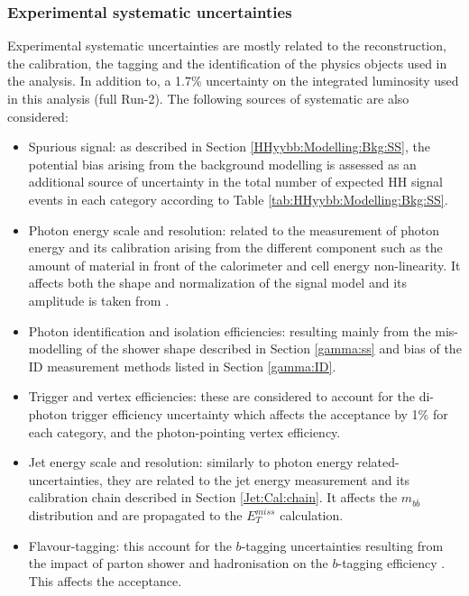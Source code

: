 \subsubsection{Experimental systematic uncertainties}
\label{HHyybb:Syst:Exp}
Experimental systematic uncertainties are mostly related to the reconstruction, the calibration, the tagging and the identification of the physics objects used in the analysis. In addition to, a 1.7\% uncertainty on the integrated luminosity used in this analysis (full Run-2). The following sources of systematic are also considered: 
\begin{itemize}
    \item Spurious signal: as described in Section \ref{HHyybb:Modelling:Bkg:SS}, the potential bias arising from the background modelling is assessed as an additional source of uncertainty in the total number of expected HH signal events in each category according to Table \ref{tab:HHyybb:Modelling:Bkg:SS}.
    \item Photon energy scale and resolution: related to the measurement of photon energy and its calibration arising from the different component such as the amount of material in front of the calorimeter and cell energy non-linearity. It affects both the shape and normalization of the signal model and its amplitude is taken from \cite{PES}.
    \item Photon identification and isolation efficiencies: resulting mainly from the mis-modelling of the shower shape described in Section \ref{gamma:ss} and bias of the ID measurement methods listed in Section \ref{gamma:ID}. 
    \item Trigger and vertex efficiencies: these are considered to account for the di-photon trigger efficiency uncertainty which affects the acceptance by 1\% for each category, and the photon-pointing vertex efficiency.
    \item Jet energy scale and resolution: similarly to photon energy related-uncertainties, they are related to the jet energy measurement and its calibration chain described in Section \ref{Jet:Cal:chain}. It affects the $m_{b\bar{b}}$ distribution and are propagated to the $E_{T}^{miss}$ calculation. 
    \item Flavour-tagging: this account for the $b$-tagging uncertainties resulting from the impact of parton shower and hadronisation on the $b$-tagging efficiency \cite{IP2}. This affects the acceptance.
\end{itemize}


